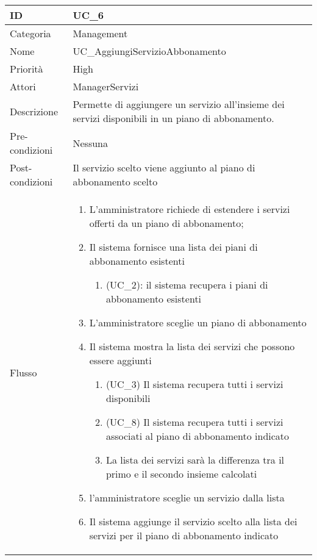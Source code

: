 \begin{center}
\begin{tabular}{ |p{2cm}|p{13cm}|  }
\hline
ID & UC\_6 \\\hline
Categoria & Management\\\hline
Nome & UC\_AggiungiServizioAbbonamento\\\hline
Priorità & High \\\hline
Attori &  ManagerServizi \\\hline
Descrizione & Permette di aggiungere un servizio all'insieme dei servizi disponibili in un piano di abbonamento.\\\hline
Pre-condizioni & Nessuna \\\hline
Post-condizioni &  Il servizio scelto viene aggiunto al piano di abbonamento scelto \\\hline
Flusso &  	\begin{enumerate}
		\item L'amministratore richiede di estendere i servizi offerti da un piano di abbonamento;
		\item Il sistema fornisce una lista dei piani di abbonamento esistenti
		\begin{enumerate}[  ]
			\item (UC\_2): il sistema recupera i piani di abbonamento esistenti
		\end{enumerate}
		\item L'amministratore sceglie un piano di abbonamento
		\item Il sistema mostra la lista dei servizi che possono essere aggiunti		
			\begin{enumerate}[label*=\arabic*.]
			\item (UC\_3) Il sistema recupera tutti i servizi disponibili
			\item (UC\_8) Il sistema recupera tutti i servizi associati al piano di abbonamento indicato
			\item La lista dei servizi sarà la differenza tra il primo e il secondo insieme calcolati
			\end{enumerate}
		\item l'amministratore sceglie un servizio dalla lista
		\item Il sistema aggiunge il servizio scelto alla lista dei servizi per il piano di abbonamento indicato
		\end{enumerate}\\\hline
\end{tabular}
\label{table_use_case:6}\newline


\end{center}
